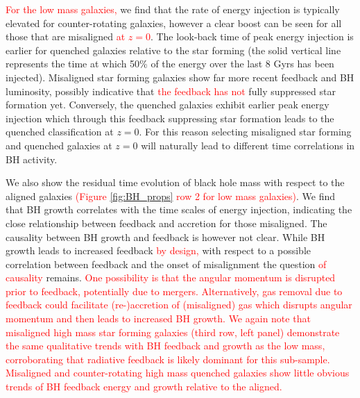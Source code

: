 \documentclass[fleqn,usenatbib]{mnras}
\newcommand{\red}[1]{{\textcolor{red}{#1}}}
\begin{document}
\red{For the low mass galaxies,} we find that the rate of energy injection is typically elevated for counter-rotating galaxies, however a clear boost can be seen for all those that are misaligned \red{at $z=0$}. The look-back time of peak energy injection is earlier for quenched galaxies relative to the star forming (the solid vertical line represents the time at which 50\% of the energy over the last 8 Gyrs has been injected). Misaligned star forming galaxies show far more recent feedback and BH luminosity, possibly indicative that \red{the feedback has not} fully suppressed star formation yet. Conversely, the quenched galaxies exhibit earlier peak energy injection which through this feedback suppressing star formation leads to the quenched classification at $z=0$. For this reason selecting misaligned star forming and quenched galaxies at $z=0$ will naturally lead to different time correlations in BH activity. 

We also show the residual time evolution of black hole mass with respect to the aligned galaxies \red{(Figure \ref{fig:BH_props} row 2 for low mass galaxies)}. We find that BH growth correlates with the time scales of energy injection, indicating the close relationship between feedback and accretion for those misaligned. The causality between BH growth and feedback is however not clear. While BH growth leads to increased feedback \red{by design,} with respect to a possible correlation between feedback and the onset of misalignment the question \red{of causality} remains. \red{One possibility is that the angular momentum is disrupted prior to feedback, potentially due to mergers. Alternatively, gas removal due to feedback could facilitate (re-)accretion of (misaligned) gas which disrupts angular momentum and then leads to increased BH growth.} \red{We again note that misaligned high mass star forming galaxies (third row, left panel) demonstrate the same qualitative trends with BH feedback and growth as the low mass, corroborating that radiative feedback is likely dominant for this sub-sample. Misaligned and counter-rotating high mass quenched galaxies show little obvious trends of BH feedback energy and growth relative to the aligned.}
\end{document}
